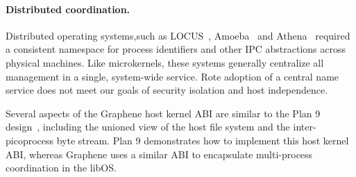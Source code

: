 \paragraph{Distributed coordination.}
Distributed operating systems,such as LOCUS~\citep{locus83sosp,fleisch86locus}, Amoeba~\citep{mullender90amoeba,cheriton89naming} and  
Athena~\citep{champine90athena} required a consistent namespace for process identifiers and other IPC abstractions
across physical machines.
Like microkernels, these systems generally centralize all management in a single, system-wide service.
Rote adoption of a central name service does not meet our goals
of security isolation and host independence.

Several aspects of the Graphene host kernel ABI are similar to the
Plan 9 design~\citep{pike90plan9}, including the unioned view of the host file system
and the inter-picoprocess byte stream.
Plan 9 demonstrates how to implement this host kernel ABI,
whereas Graphene uses a similar ABI 
to encapsulate multi-process coordination 
in the libOS.





